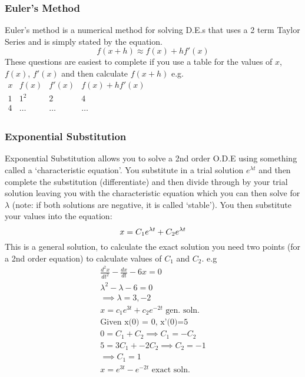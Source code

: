 \documentclass[12pt] {article}
\begin{document}
\subsubsection*{Euler's Method}
Euler's method is a numerical method for solving D.E.s that uses a 2 term Taylor Series 
and is simply stated by the equation.
\begin{equation*}
  f(x+h) \approx f(x) + hf'(x)
\end{equation*}
These questions are easiest to complete if you use a table for the values 
of $x$, $f(x)$, $f'(x)$ and then calculate $f(x+h)$ e.g.
\vspace{1em}
\newline
$\begin{array}{c|c|c|c}
  x & f(x) & f'(x) & f(x) + hf'(x) \\
  1 & 1^2 & 2 & 4 \\
  4 & \dots & \dots & \dots \\
\end{array}$

\subsubsection*{Exponential Substitution}
Exponential Substitution allows you to solve a 2nd order O.D.E using something called
a `characteristic equation'. You substitute in a trial solution $e^{\lambda t}$
and then complete the substitution (differentiate) and then divide through by your 
trial solution leaving you with the characteristic equation which you can then solve for
$\lambda$ (note: if both solutions are negative, it is called `stable'). You then substitute your values into the equation:
\begin{equation*}
  x=C_1e^{\lambda t} + C_2e^{\lambda t} \\
\end{equation*}
This is a general solution, to calculate the exact solution you need two points 
(for a 2nd order equation) to calculate values of $C_1$ and $C_2$. e.g
\begin{gather*}
  \frac{d^2x}{dt^2} - \frac{dx}{dt} -6x =0 \\
  \lambda^2 - \lambda - 6 = 0\\
  \implies \lambda=3,-2 \\
  x=c_1e^{3t} + c_2e^{-2t} \text{ gen. soln.} \\
  \text{Given x(0) = 0, x'(0)=5} \\
  0 = C_1 + C_2 \implies C_1 = -C_2 \\
  5 = 3C_1 + -2C_2 \implies C_2 = -1 \\
  \implies C_1 = 1 \\
  x=e^{3t} - e^{-2t} \text{ exact soln.} \\
\end{gather*}
\end{document}
